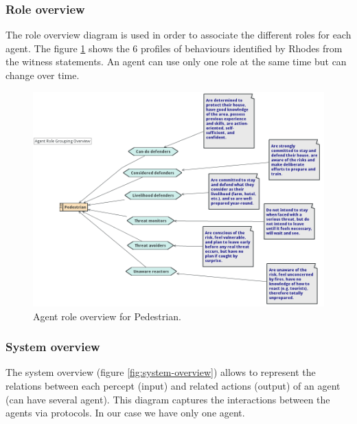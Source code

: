 \documentclass[12pt, a4paper]{memoir} %
\begin{document}
			\subsubsection{Role overview}

				The role overview diagram is used in order to associate the different roles for each agent.
				The figure \ref{fig:agent-role-overview} shows the 6 profiles of behaviours identified by Rhodes\cite{rhodes2014}
				from the witness statements. An agent can use only one role at the same time but can change over time.

				\begin{figure}
					\begin{center}
						\includegraphics[scale=0.4]{Agent-role-grouping-overview.png}
						\caption{\label{fig:agent-role-overview} Agent role overview for Pedestrian.}
					\end{center}
				\end{figure}

			\subsubsection{System overview}

				The system overview (figure \ref{fig:system-overview}) allows to represent the relations between each percept (input) and related actions (output) of
				an agent (can have several agent). This diagram captures the interactions between the agents via protocols. In our
				case we have only one agent.
\end{document}
